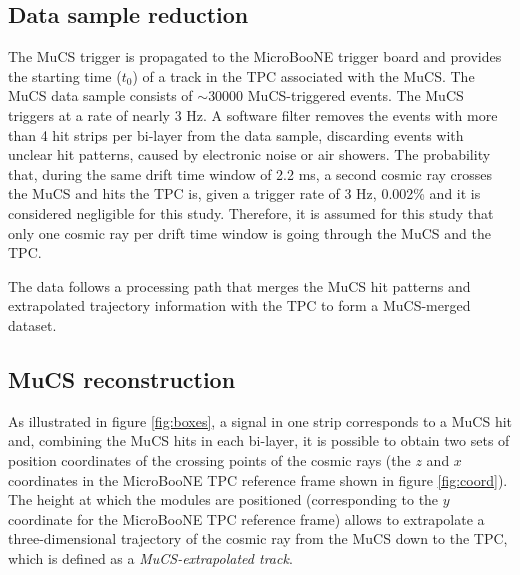 \documentclass[a4paper,11pt]{article}
\begin{document}
\subsection{Data sample reduction}\label{sec:data_proc}
The MuCS trigger is propagated to the MicroBooNE trigger board and provides the starting time ($t_0$) of a track in the TPC associated with the MuCS. The MuCS data sample consists of $\sim$30000 MuCS-triggered events.
The MuCS triggers at a rate of nearly 3 Hz.
A software filter removes the events with more than 4 hit strips per bi-layer from the data sample, discarding events with unclear hit patterns, caused by electronic noise or air showers.
The probability that, during the same drift time window of 2.2 ms, a second cosmic ray crosses the MuCS and hits the TPC is, given a trigger rate of 3 Hz, 0.002\% and it is considered negligible for this study. Therefore, it is assumed for this study that only one cosmic ray per drift time window is going through the MuCS and the TPC.

The data follows a processing path that merges the MuCS hit patterns and extrapolated trajectory information with the TPC to form a MuCS-merged dataset. %


\subsection{MuCS reconstruction}
As illustrated in figure \ref{fig:boxes}, a signal in one strip corresponds to a MuCS hit and, combining the MuCS hits in each bi-layer, it is possible to obtain two sets of position coordinates of the crossing points of the cosmic rays (the $z$ and $x$ coordinates in the MicroBooNE TPC reference frame shown in figure \ref{fig:coord}). The height at which the modules are positioned (corresponding to the $y$ coordinate for the MicroBooNE TPC reference frame) allows to extrapolate a three-dimensional trajectory of the cosmic ray from the MuCS down to the TPC, which is defined as a \emph{MuCS-extrapolated track}.
\end{document}
